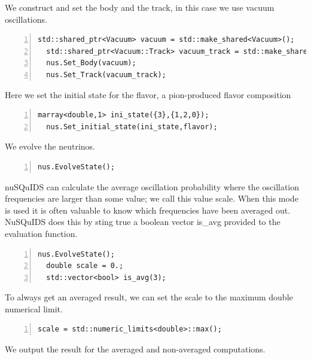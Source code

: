 \documentclass[3p,12pt]{elsarticle}
\newcommand{\ttf}{\ttfamily}
\begin{document}
We construct and set the body and the track, in this case we use vacuum
oscillations.

\begin{lstlisting}[frame=leftline, numbers =
  left,breaklines=true,label = ex:sin1]
  std::shared_ptr<Vacuum> vacuum = std::make_shared<Vacuum>();
  std::shared_ptr<Vacuum::Track> vacuum_track = std::make_shared<Vacuum::Track>(1.e3*units.kparsec);
  nus.Set_Body(vacuum);
  nus.Set_Track(vacuum_track);
\end{lstlisting}

Here we set the initial state for the flavor, a pion-produced flavor composition

\begin{lstlisting}[frame=leftline, numbers =
  left,breaklines=true,label = ex:sin1]
  marray<double,1> ini_state({3},{1,2,0});
  nus.Set_initial_state(ini_state,flavor);
\end{lstlisting}

We evolve the neutrinos.

\begin{lstlisting}[frame=leftline, numbers =
  left,breaklines=true,label = ex:sin1]
  nus.EvolveState();
\end{lstlisting}

nuSQuIDS can calculate the average oscillation probability
where the oscillation frequencies are larger than some value;
we call this value {\ttf scale}. When this mode is used it is often
valuable to know which frequencies have been averaged out.
NuSQuIDS does this by sting true a boolean vector {\ttf is\_avg} provided to the
evaluation function.

\begin{lstlisting}[frame=leftline, numbers =
  left,breaklines=true,label = ex:sin1]
  nus.EvolveState();
  double scale = 0.;
  std::vector<bool> is_avg(3);
\end{lstlisting}

To always get an averaged result, we can set the scale to the maximum
double numerical limit.

\begin{lstlisting}[frame=leftline, numbers =
  left,breaklines=true,label = ex:sin1]
  scale = std::numeric_limits<double>::max();
\end{lstlisting}

We output the result for the averaged and non-averaged computations.
\end{document}
